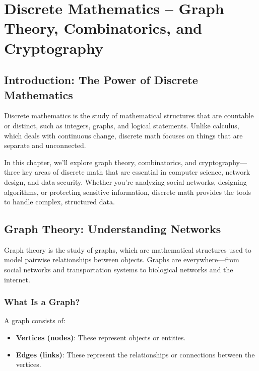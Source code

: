 \chapter{Discrete Mathematics – Graph Theory, Combinatorics, and Cryptography}

\section{Introduction: The Power of Discrete Mathematics}
Discrete mathematics is the study of mathematical structures that are countable or distinct, such as integers, graphs, and logical statements. Unlike calculus, which deals with continuous change, discrete math focuses on things that are separate and unconnected.

In this chapter, we’ll explore graph theory, combinatorics, and cryptography—three key areas of discrete math that are essential in computer science, network design, and data security. Whether you’re analyzing social networks, designing algorithms, or protecting sensitive information, discrete math provides the tools to handle complex, structured data.

\section{Graph Theory: Understanding Networks}
Graph theory is the study of graphs, which are mathematical structures used to model pairwise relationships between objects. Graphs are everywhere—from social networks and transportation systems to biological networks and the internet.

\subsection{What Is a Graph?}
A graph consists of:
\begin{itemize}
    \item \textbf{Vertices (nodes)}: These represent objects or entities.
    \item \textbf{Edges (links)}: These represent the relationships or connections between the vertices.
\end{itemize}

